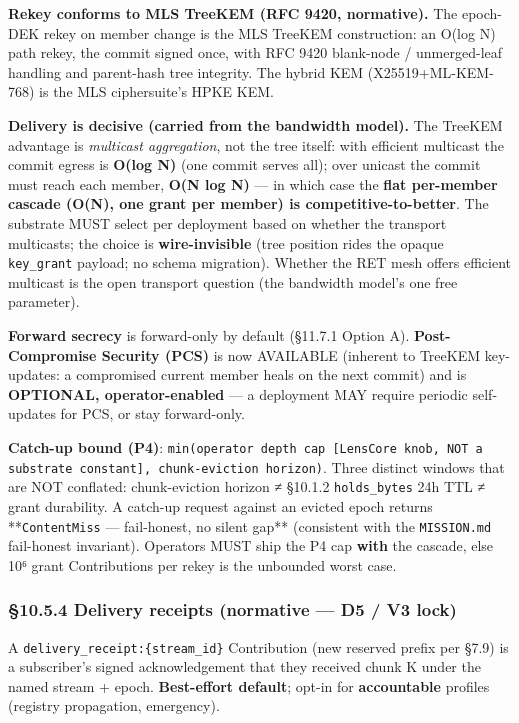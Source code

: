 \documentclass[11pt]{article}
\begin{document}
\textbf{Rekey conforms to MLS TreeKEM (RFC 9420, normative).} The epoch-DEK rekey on member change is the MLS TreeKEM construction: an O(log N) path rekey, the commit signed once, with RFC 9420 blank-node / unmerged-leaf handling and parent-hash tree integrity. The hybrid KEM (X25519+ML-KEM-768) is the MLS ciphersuite's HPKE KEM.


\textbf{Delivery is decisive (carried from the bandwidth model).} The TreeKEM advantage is \textit{multicast aggregation}, not the tree itself: with efficient multicast the commit egress is \textbf{O(log N)} (one commit serves all); over unicast the commit must reach each member, \textbf{O(N log N)} — in which case the \textbf{flat per-member cascade (O(N), one grant per member) is competitive-to-better}. The substrate MUST select per deployment based on whether the transport multicasts; the choice is \textbf{wire-invisible} (tree position rides the opaque \texttt{key\_grant} payload; no schema migration). Whether the RET mesh offers efficient multicast is the open transport question (the bandwidth model's one free parameter).


\textbf{Forward secrecy} is forward-only by default (§11.7.1 Option A). \textbf{Post-Compromise Security (PCS)} is now AVAILABLE (inherent to TreeKEM key-updates: a compromised current member heals on the next commit) and is \textbf{OPTIONAL, operator-enabled} — a deployment MAY require periodic self-updates for PCS, or stay forward-only.


\textbf{Catch-up bound (P4)}: \texttt{min(operator depth cap [LensCore knob, NOT a substrate constant], chunk-eviction horizon)}. Three distinct windows that are NOT conflated: chunk-eviction horizon ≠ §10.1.2 \texttt{holds\_bytes} 24h TTL ≠ grant durability. A catch-up request against an evicted epoch returns **\texttt{ContentMiss} — fail-honest, no silent gap** (consistent with the \texttt{MISSION.md} fail-honest invariant). Operators MUST ship the P4 cap \textbf{with} the cascade, else 10⁶ grant Contributions per rekey is the unbounded worst case.


\subsubsection*{§10.5.4 Delivery receipts (normative — D5 / V3 lock)}


A \texttt{delivery\_receipt:\{stream\_id\}} Contribution (new reserved prefix per §7.9) is a subscriber's signed acknowledgement that they received chunk K under the named stream + epoch. \textbf{Best-effort default}; opt-in for \textbf{accountable} profiles (registry propagation, emergency).
\end{document}
